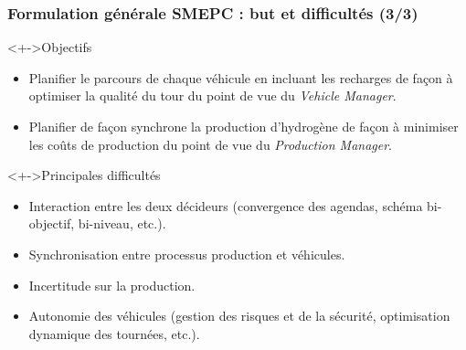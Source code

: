 \documentclass[hyperref={bookmarks=false},aspectratio=169]{beamer}
\begin{document}
\begin{frame}
\begin{minipage}{.5\textwidth}
\end{minipage}%


\end{frame}

\begin{frame}
\frametitle{Formulation générale SMEPC : but et difficultés (3/3) } 



\begin{block}<+->{Objectifs}
\begin{itemize}
 \item Planifier le parcours de chaque véhicule en incluant les recharges de façon à optimiser la qualité du
tour du point de vue du \textit{Vehicle Manager}.
  \item Planifier de façon synchrone la production d’hydrogène de façon à minimiser les coûts de
production du point de vue du \textit{Production Manager}.
 \end{itemize}
 \end{block}
 \begin{alertblock}<+->{Principales difficultés}
\begin{itemize}
 
 \item Interaction entre les deux décideurs (convergence des agendas, %
 schéma bi-objectif, %
 bi-niveau,%
 etc.).
 \item Synchronisation entre processus production et véhicules.
  \item Incertitude sur la production.
  \item Autonomie des véhicules (gestion des risques et de la sécurité, optimisation dynamique des tournées, etc.).
\end{itemize}
 \end{alertblock}
\end{frame}
\end{document}
